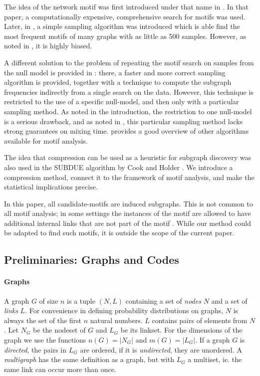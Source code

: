 The idea of the network motif was first introduced under that name in \cite{milo2002network}. In that paper, a computationally expensive, comprehensive search for motifs was used. Later, in \cite{kashtan2004efficient}, a simple sampling algorithm was introduced which is able find the most frequent motifs of many graphs with as little as 500 samples. However, as noted in \cite{wernicke2005faster}, it is highly biased.

A different solution to the problem of repeating the motif search on samples from the null model is provided in \cite{wernicke2005faster}: there, a faster and more correct sampling algorithm is provided, together with a technique to compute the subgraph frequencies indirectly from a single search on the data. However, this technique is restricted to the use of a specific null-model, and then only with a particular sampling method. As noted in the introduction, the restriction to one null-model is a serious drawback, and as noted in \cite{charo2010efficient}, this particular sampling method lacks strong guarantees on mixing time. \cite{ribeiro2009strategies} provides a good overview of other algorithms available for motif analysis.

The idea that compression can be used as a heuristic for subgraph discovery was also used in the SUBDUE algorithm by Cook and Holder \cite{cook1994substructure}. We introduce a compression method, connect it to the framework of motif analysis, and make the statistical implications precise.

In this paper, all candidate-motifs are induced subgraphs. This is not common to all motif analysis; in some settings the instances of the motif are allowed to have additional internal links that are not part of the motif \cite{chen2006nemofinder}. While our method could be adapted to find such motifs, it is outside the scope of the current paper.

\subsection*{Preliminaries: Graphs and Codes}
\label{section:preliminaries}

\paragraph{Graphs} A graph $G$ of size $n$ is a tuple $(N, L)$ containing a set of \emph{nodes} $N$ and a set of \emph{links} $L$. For convenience in defining probability distributions on graphs, $N$ is always the set of the first $n$ natural numbers. $L$ contains pairs of elements from $N$. Let $N_G$ be the nodeset of $G$ and $L_G$ be its linkset. For the dimensions of the graph we use the functions $n(G) = |N_G|$ and $m(G) = |L_G|$. If a graph $G$ is \emph{directed}, the pairs in $L_G$ are ordered, if it is \emph{undirected}, they are unordered. A \emph{multigraph} has the same definition as a graph, but with $L_G$ a multiset, ie. the same link can occur more than once.

